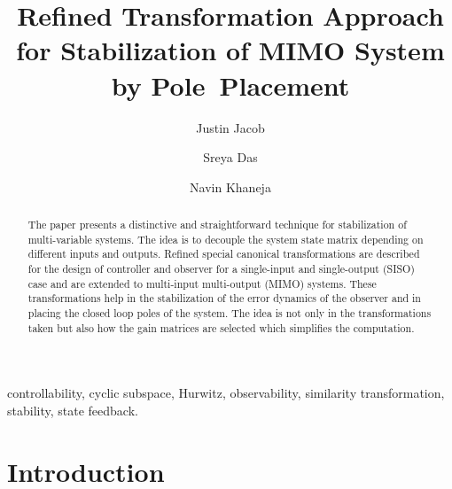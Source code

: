 \documentclass{elsarticle}
\numberwithin{equation}{section}
\begin{document}
\begin{frontmatter}

\title{\textbf{Refined Transformation Approach for Stabilization of MIMO System by Pole~Placement}}

\author{Justin Jacob}               %
\author{Sreya Das}    %
\author{Navin Khaneja}  %

\address{Systems and Control Engineering Department, \\Indian Institute of Technology, Bombay}%

\begin{abstract}

The paper presents a distinctive and straightforward technique for stabilization of multi-variable systems. The idea is to decouple the system state matrix depending on different inputs and outputs. Refined special canonical transformations are described for the design of controller and observer for a single-input and single-output (SISO) case and are extended to multi-input multi-output (MIMO) systems. These transformations help in the stabilization of the error dynamics of the observer and in placing the closed loop poles of the system. The idea is not only in the transformations taken but also how the gain matrices are selected which simplifies the computation.

\end{abstract}

\begin{keyword}
controllability, cyclic subspace, Hurwitz, observability, similarity transformation, stability, state feedback.
\end{keyword}

\end{frontmatter}

\section{Introduction}
\end{document}
